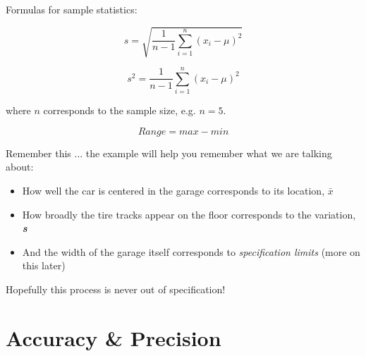 Formulas for sample statistics:

\begin{center}
\begin{equation}
s = \sqrt{\frac{1}{n-1}\displaystyle\sum_{i=1}^{n}{\left( x_{i}-\mu\right)}^2 }
\end{equation}

\begin{equation}
s^{2} = {\frac{1}{n-1}\displaystyle\sum_{i=1}^{n}{\left( x_{i}-\mu\right)}^2 }
\end{equation}
\end{center}

where $ n $ corresponds to the sample size, e.g.  $ n = 5$.

\begin{center}
\begin{equation}
Range = max - min
\end{equation}

\end{center}
Remember this ... the example will help you remember what we are talking about:


  \begin{itemize}
  \item How well the car is centered in the garage corresponds to its location, $ \bar{x} $
  \item How broadly the tire tracks appear on the floor corresponds to the variation, \textbf{\textit{s}}
  \item And the width of the garage itself corresponds to  \textit{specification limits} (more on this later)
  \end{itemize}
Hopefully this process is never out of specification!

\section{Accuracy \& Precision}
